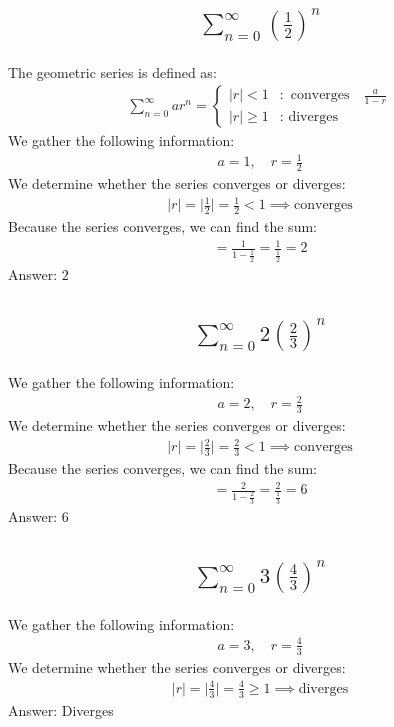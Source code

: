 \documentclass{article}
\begin{document}
\subsection{
	\begin{align*}
		\sum_{n = 0}^\infty \left( \frac{1}{2} \right)^n
	\end{align*}
}
The geometric series is defined as:
\begin{align*}
	\sum_{n = 0}^\infty ar^n = 
	\begin{cases}
		\left| r \right| < 1 & : \text{ converges} \quad \frac{a}{1 - r} \\
		\left| r \right| \ge 1 & : \text{ diverges}
	\end{cases}
\end{align*}
We gather the following information:
\begin{align*}
	a = 1, \quad r = \frac{1}{2}
\end{align*}
We determine whether the series converges or diverges:
\begin{align*}
	|r| = \bigg| \frac{1}{2} \bigg| = \frac{1}{2} < 1 \implies \text{converges}
\end{align*}
Because the series converges, we can find the sum:
\begin{align*}
	= \frac{1}{1 - \frac{1}{2}} = \frac{1}{
	\frac{1}{2}} = 2
\end{align*}
Answer: $2$

\subsection{
	\begin{align*}
		\sum_{n = 0}^\infty 2 \left( \frac{2}{3} \right)^n
	\end{align*}
}
We gather the following information:
\begin{align*}
	a = 2, \quad r = \frac{2}{3}
\end{align*}
We determine whether the series converges or diverges:
\begin{align*}
	|r| = \bigg| \frac{2}{3} \bigg| = \frac{2}{3} < 1 \implies \text{converges}
\end{align*}
Because the series converges, we can find the sum:
\begin{align*}
	= \frac{2}{1 - \frac{2}{3}} = \frac{2}{\frac{1}{3}} = 6
\end{align*}
Answer: $6$

\subsection{
	\begin{align*}
		\sum_{n = 0}^\infty 3 \left( \frac{4}{3} \right)^n
	\end{align*}
}
We gather the following information:
\begin{align*}
	a = 3, \quad r = \frac{4}{3}
\end{align*}
We determine whether the series converges or diverges:
\begin{align*}
	|r| = \bigg| \frac{4}{3} \bigg| = \frac{4}{3} \geq 1 \implies \text{diverges}
\end{align*}
Answer: Diverges
\end{document}
